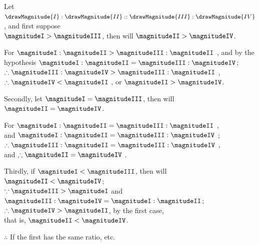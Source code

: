 \documentclass[booklanguage=english]{byrnebook}
\begin{document}
\begin{center}
Let $\drawMagnitude{I} : \drawMagnitude{II} :: \drawMagnitude{III} : \drawMagnitude{IV}$, and first suppose\\
$\magnitudeI > \magnitudeIII$, then will $\magnitudeII > \magnitudeIV$.

For $\magnitudeI : \magnitudeII > \magnitudeIII : \magnitudeII$ , and by the hypothesis $\magnitudeI : \magnitudeII = \magnitudeIII : \magnitudeIV$;\\
$\therefore \magnitudeIII : \magnitudeIV > \magnitudeIII : \magnitudeII$ ,\\
$\therefore \magnitudeIV < \magnitudeII$ , or $\magnitudeII > \magnitudeIV$.

Secondly, let $\magnitudeI = \magnitudeIII$, then will $\magnitudeII = \magnitudeIV$.

For $\magnitudeI : \magnitudeII = \magnitudeIII : \magnitudeII$ ,\\
and $\magnitudeI : \magnitudeII = \magnitudeIII : \magnitudeIV$ \byref{\hypref};\\
$\therefore \magnitudeIII : \magnitudeII = \magnitudeIII : \magnitudeIV$ ,\\
and $\therefore \magnitudeII = \magnitudeIV$ .

Thirdly, if $\magnitudeI < \magnitudeIII$, then will $\magnitudeII < \magnitudeIV$;\\
$\because \magnitudeIII > \magnitudeI$ and $\magnitudeIII : \magnitudeIV = \magnitudeI : \magnitudeII$;\\ %
$\therefore \magnitudeIV > \magnitudeII$, by the first case,\\
that is, $\magnitudeII < \magnitudeIV$.

$\therefore$ If the first has the same ratio, etc.
\end{center}

\vfill\pagebreak

\label{prop:V.XV}
\end{document}
